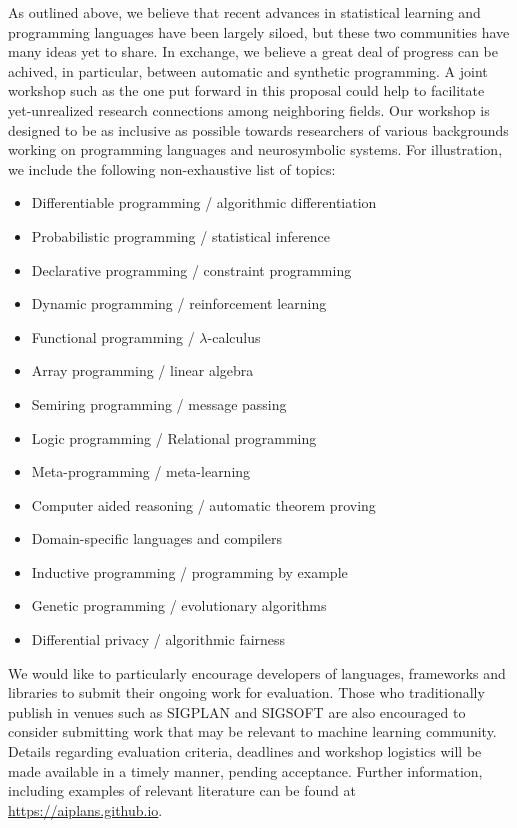 \documentclass{article}
\begin{document}
    As outlined above, we believe that recent advances in statistical learning and programming languages have been largely siloed, but these two communities have many ideas yet to share. In exchange, we believe a great deal of progress can be achived, in particular, between automatic and synthetic programming. A joint workshop such as the one put forward in this proposal could help to facilitate yet-unrealized research connections among neighboring fields. Our workshop is designed to be as inclusive as possible towards researchers of various backgrounds working on programming languages and neurosymbolic systems. For illustration, we include the following non-exhaustive list of topics:

    \begin{itemize}
      \item Differentiable programming / algorithmic differentiation
      \item Probabilistic programming / statistical inference
      \item Declarative programming / constraint programming
      \item Dynamic programming / reinforcement learning
      \item Functional programming / $\lambda$-calculus
      \item Array programming / linear algebra
      \item Semiring programming / message passing
      \item Logic programming / Relational programming
      \item Meta-programming / meta-learning
      \item Computer aided reasoning / automatic theorem proving
      \item Domain-specific languages and compilers
      \item Inductive programming / programming by example
      \item Genetic programming / evolutionary algorithms
      \item Differential privacy / algorithmic fairness
    \end{itemize}

    We would like to particularly encourage developers of languages, frameworks and libraries to submit their ongoing work for evaluation. Those who traditionally publish in venues such as SIGPLAN and SIGSOFT are also encouraged to consider submitting work that may be relevant to machine learning community. Details regarding evaluation criteria, deadlines and workshop logistics will be made available in a timely manner, pending acceptance. Further information, including examples of relevant literature can be found at \url{https://aiplans.github.io}.
\end{document}
